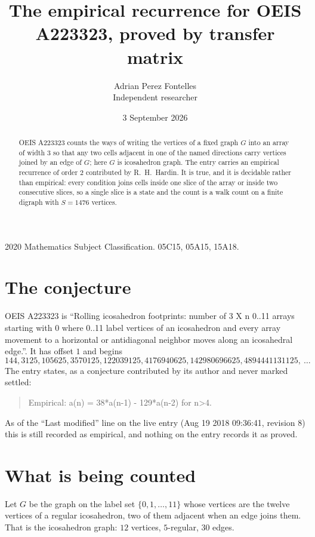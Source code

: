 \documentclass[11pt,a4paper]{article}
\title{The empirical recurrence for OEIS A223323, proved by transfer matrix}
\author{Adrian Perez Fontelles\\ \small Independent researcher}
\date{3 September 2026}
\theoremstyle{plain}
\theoremstyle{definition}
\begin{document}
\maketitle

\begin{abstract}
OEIS A223323 counts the ways of writing the vertices of a fixed graph $G$ into an array of width
$3$ so that any two cells adjacent in one of the named directions carry vertices joined by an
edge of $G$; here $G$ is icosahedron graph. The entry carries an empirical recurrence of order $2$
contributed by R.~H.~Hardin. It is true, and it is decidable rather than empirical: every
condition joins cells inside one slice of the array or inside two consecutive slices, so a
single slice is a state and the count is a walk count on a finite digraph with $S=1476$ vertices.
\end{abstract}

\noindent\small 2020 Mathematics Subject Classification. 05C15, 05A15, 15A18.\normalsize

\section{The conjecture}

OEIS A223323 is ``Rolling icosahedron footprints: number of 3 X n 0..11 arrays starting with 0 where 0..11 label vertices of an icosahedron and every array movement to a horizontal or antidiagonal neighbor moves along an icosahedral edge.''. It has offset $1$ and begins
\[
144, 3125, 105625, 3570125, 122039125, 4176940625, 142980696625, 4894441131125,\ \dots
\]
The entry states, as a conjecture contributed by its author and never marked settled:
\begin{quote}
Empirical: a(n) = 38*a(n-1) - 129*a(n-2) for n>4.
\end{quote}
As of the ``Last modified'' line on the live entry (Aug 19 2018 09:36:41, revision 8) this is still
recorded as empirical, and nothing on the entry records it as proved.

\section{What is being counted}

Let $G$ be the graph on the label set $\{0,1,\dots,11\}$ whose vertices are the twelve vertices of a regular icosahedron, two of them adjacent when an edge joins them. That is the icosahedron graph: $12$ vertices, $5$-regular, $30$ edges.
\end{document}
